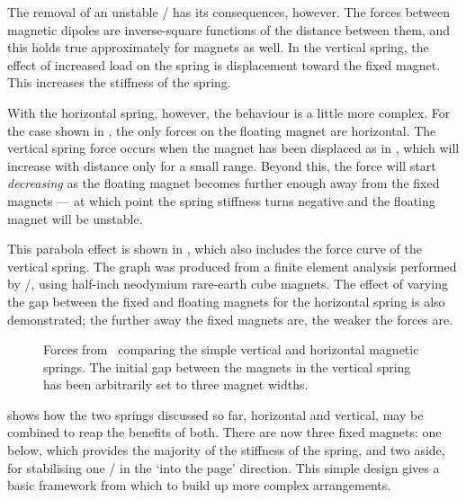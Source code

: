 \documentclass[11pt,a4paper]{memoir}
\begin{document}
The removal of an unstable \dof/ has its consequences, however.
The forces between magnetic dipoles are inverse-square functions of the distance between them, and this holds true approximately for magnets as well.
In the vertical spring, the effect of increased load on the spring is displacement toward the fixed magnet.
This increases the stiffness of the spring.

With the horizontal spring, however, the behaviour is a little more complex.
For the case shown in , the only forces on the floating magnet are horizontal.
The vertical spring force occurs when the magnet has been displaced as in , which will increase with distance only for a small range.
Beyond this, the force will start \emph{decreasing} as the floating magnet becomes further enough away from the fixed magnets — at which point the spring stiffness turns negative and the floating magnet will be unstable.

This parabola effect is shown in , which also includes the force curve of the vertical spring.
The graph was produced from a finite element analysis performed by \ANSYS/, using half-inch neodymium rare-earth cube magnets.
The effect of varying the gap between the fixed and floating magnets for the horizontal spring is also demonstrated; the further away the fixed magnets are, the weaker the forces are.

\begin{figure}
  \begin{wide}
    \raggedout
    \hfill
    \hfill
    \null
  \end{wide}
  \caption[Spring forces of the vertical \& horizontal springs.]{Forces from
\FEA\ comparing the simple vertical and horizontal magnetic springs.
The initial gap between the magnets in the vertical spring has been arbitrarily
set to three magnet widths.}
\end{figure}

 shows how the two springs discussed so far, horizontal and vertical, may be combined to reap the benefits of both.
There are now three fixed magnets: one below, which provides the majority of the stiffness of the spring, and two aside, for stabilising one \dof/ in the `into the page' direction.
This simple design gives a basic framework from which to build up more complex arrangements.
\end{document}
